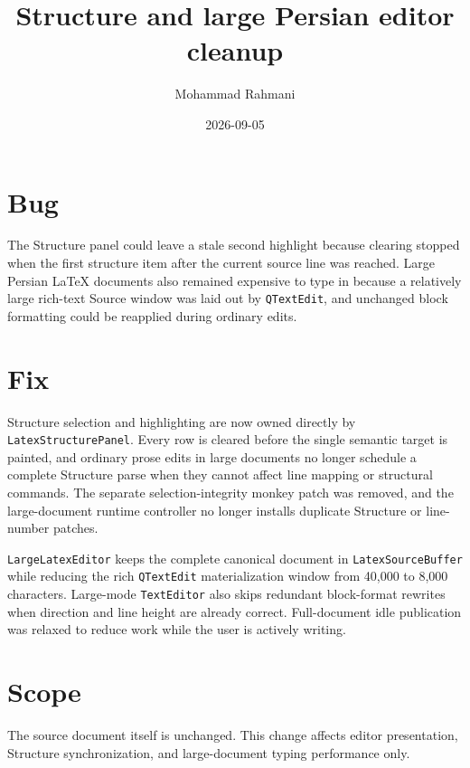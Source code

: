 \documentclass[a4paper]{article}
\title{Structure and large Persian editor cleanup}
\date{2026-09-05}
\author{Mohammad Rahmani}
\begin{document}
   \maketitle

   \section{Bug}
   The Structure panel could leave a stale second highlight because clearing stopped when the first structure item after the current source line was reached. Large Persian LaTeX documents also remained expensive to type in because a relatively large rich-text Source window was laid out by \texttt{QTextEdit}, and unchanged block formatting could be reapplied during ordinary edits.

   \section{Fix}
   Structure selection and highlighting are now owned directly by \texttt{LatexStructurePanel}. Every row is cleared before the single semantic target is painted, and ordinary prose edits in large documents no longer schedule a complete Structure parse when they cannot affect line mapping or structural commands. The separate selection-integrity monkey patch was removed, and the large-document runtime controller no longer installs duplicate Structure or line-number patches.

   \texttt{LargeLatexEditor} keeps the complete canonical document in \texttt{LatexSourceBuffer} while reducing the rich \texttt{QTextEdit} materialization window from 40,000 to 8,000 characters. Large-mode \texttt{TextEditor} also skips redundant block-format rewrites when direction and line height are already correct. Full-document idle publication was relaxed to reduce work while the user is actively writing.

   \section{Scope}
   The source document itself is unchanged. This change affects editor presentation, Structure synchronization, and large-document typing performance only.

   
   
\end{document}
